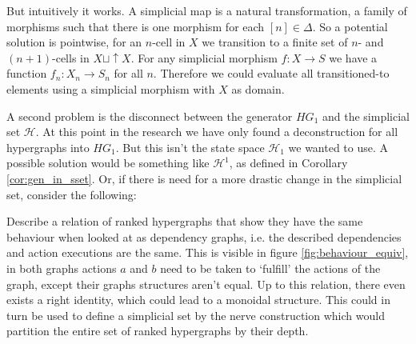 \documentclass[12pt]{article}
\theoremstyle{definition}
\newcommand{\1}{\mathbbm{1}}
\renewcommand{\H}{\mathcal{H}}
\begin{document}
But intuitively it works. A simplicial map is a natural transformation, a family of morphisms such that there is one morphism for each $[n]\in \Delta$. So a potential solution is pointwise, for an $n$-cell in $X$ we transition to a finite set of $n$- and $(n+1)$-cells in $X\sqcup \uparrow X$. For any simplicial morphism $f: X\to S$ we have a function $f_n: X_n\to S_n$ for all $n$. Therefore we could evaluate all transitioned-to elements using a simplicial morphism with $X$ as domain.

A second problem is the disconnect between the generator $HG_1$ and the simplicial set $\H$. At this point in the research we have only found a deconstruction for all hypergraphs into $HG_1$. But this isn't the state space $\H_1$ we wanted to use. A possible solution would be something like $\H^1$, as defined in Corollary \ref{cor:gen_in_sset}. Or, if there is need for a more drastic change in the simplicial set, consider the following:

Describe a relation of ranked hypergraphs that show they have the same behaviour when looked at as dependency graphs, i.e. the described dependencies and action executions are the same. This is visible in figure \ref{fig:behaviour_equiv}, in both graphs actions $a$ and $b$ need to be taken to `fulfill' the actions of the graph, except their graphs structures aren't equal. Up to this relation, there even exists a right identity, which could lead to a monoidal structure. This could in turn be used to define a simplicial set by the nerve construction which would partition the entire set of ranked hypergraphs by their depth. 
\end{document}

